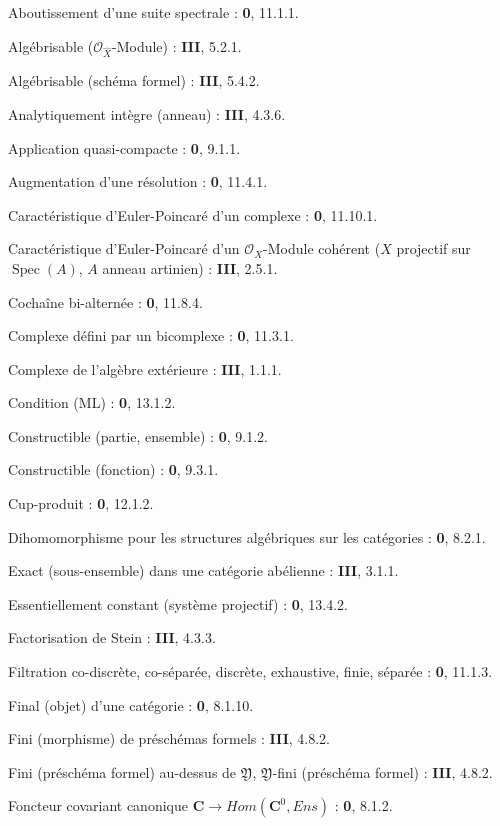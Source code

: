 \begin{flushleft}
Aboutissement d'une suite spectrale : \textbf{0}, 11.1.1.

Algébrisable ($\mathcal O_{\widehat X}$-Module) : \textbf{III}, 5.2.1.

Algébrisable (schéma formel) : \textbf{III}, 5.4.2.

Analytiquement intègre (anneau) : \textbf{III}, 4.3.6.

Application quasi-compacte : \textbf{0}, 9.1.1.

Augmentation d'une résolution : \textbf{0}, 11.4.1.

Caractéristique d'Euler-Poincaré d'un complexe : \textbf{0}, 11.10.1.

Caractéristique d'Euler-Poincaré d'un $\mathcal O_X$-Module cohérent ($X$
projectif sur $\operatorname{Spec}(A)$, $A$ anneau artinien) : \textbf{III}, 2.5.1.

Cochaîne bi-alternée : \textbf{0}, 11.8.4.

Complexe défini par un bicomplexe : \textbf{0}, 11.3.1.

Complexe de l'algèbre extérieure : \textbf{III}, 1.1.1.

Condition (ML) : \textbf{0}, 13.1.2.

Constructible (partie, ensemble) : \textbf{0}, 9.1.2.

Constructible (fonction) : \textbf{0}, 9.3.1.

Cup-produit : \textbf{0}, 12.1.2.

Dihomomorphisme pour les structures algébriques sur les catégories : \textbf{0}, 8.2.1.

Exact (sous-ensemble) dans une catégorie abélienne : \textbf{III}, 3.1.1.

Essentiellement constant (système projectif) : \textbf{0}, 13.4.2.

Factorisation de Stein : \textbf{III}, 4.3.3.

Filtration co-discrète, co-séparée, discrète, exhaustive, finie, séparée :
\textbf{0}, 11.1.3.

Final (objet) d'une catégorie : \textbf{0}, 8.1.10.

Fini (morphisme) de préschémas formels : \textbf{III}, 4.8.2.

Fini (préschéma formel) au-dessus de $\mathfrak Y$,
$\mathfrak Y$-fini (préschéma formel) : \textbf{III}, 4.8.2.

Foncteur covariant canonique $\boldsymbol{C}\to\boldsymbol{\mathit{Hom}}(\boldsymbol{C}^0,\boldsymbol{\mathit{Ens}})$ :
\textbf{0}, 8.1.2.


\end{flushleft}
